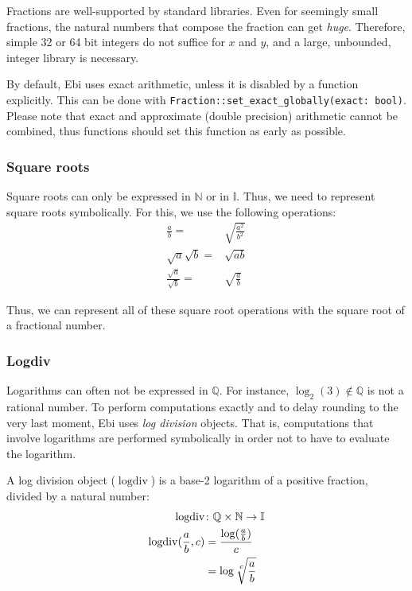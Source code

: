 \documentclass{article}
\DeclareMathOperator{\logdiv}{logdiv}
\begin{document}
        Fractions are well-supported by standard libraries.
        Even for seemingly small fractions, the natural numbers that compose the fraction can get \emph{huge}.
        Therefore, simple 32 or 64 bit integers do not suffice for $x$ and $y$, and a large, unbounded, integer library is necessary.
    
        By default, Ebi uses exact arithmetic, unless it is disabled by a function explicitly.
        This can be done with \verb=Fraction::set_exact_globally(exact: bool)=.
        Please note that exact and approximate (double precision) arithmetic cannot be combined, thus functions should set this function as early as possible.

        \subsubsection{Square roots}
            Square roots can only be expressed in $\mathbb{N}$ or in $\mathbb{I}$.
            Thus, we need to represent square roots symbolically.
            For this, we use the following operations:
            \begin{align*}
                \frac{a}{b} ={}& \sqrt{\frac{a^2}{b^2}}\\
                \sqrt{a} \sqrt{b} ={}& \sqrt{a b}\\
                \frac{\sqrt{a}}{\sqrt{b}} ={}& \sqrt{\frac{a}{b}}
            \end{align*}
    
            Thus, we can represent all of these square root operations with the square root of a fractional number.

        \subsubsection{Logdiv}
            Logarithms can often not be expressed in $\mathbb{Q}$.
            For instance, $\log_2(3) \notin \mathbb{Q}$ is not a rational number.
            To perform computations exactly and to delay rounding to the very last moment, Ebi uses \emph{log division} objects.
            That is, computations that involve logarithms are performed symbolically in order not to have to evaluate the logarithm.
            
            A log division object ($\logdiv$) is a base-2 logarithm of a positive fraction, divided by a natural number:
            \begin{align*}
                \logdiv &{}\colon \mathbb{Q} \times \mathbb{N} \rightarrow \mathbb{I}\\
                \logdiv(\frac{a}{b}, c) &{}= \frac{\log(\frac{a}{b})}{c}\\
                &{}= \log \sqrt[\leftroot{-1}\uproot{2}\scriptstyle c]{\frac{a}{b}}
            \end{align*}
\end{document}

